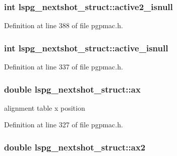 \hypertarget{structlspg__nextshot__struct_a1aa11ff4a4c8d69695786b4349e84e6b}{
\subsubsection[{active2\-\_\-isnull}]{\setlength{\rightskip}{0pt plus 5cm}int lspg\-\_\-nextshot\-\_\-struct\-::active2\-\_\-isnull}}\label{structlspg__nextshot__struct_a1aa11ff4a4c8d69695786b4349e84e6b}


Definition at line 388 of file pgpmac.\-h.

\hypertarget{structlspg__nextshot__struct_a9f777671ec617a0f533b3c51f28babb3}{
\subsubsection[{active\-\_\-isnull}]{\setlength{\rightskip}{0pt plus 5cm}int lspg\-\_\-nextshot\-\_\-struct\-::active\-\_\-isnull}}\label{structlspg__nextshot__struct_a9f777671ec617a0f533b3c51f28babb3}


Definition at line 337 of file pgpmac.\-h.

\hypertarget{structlspg__nextshot__struct_a7f57874223897ab7d9c7531a9522904d}{
\subsubsection[{ax}]{\setlength{\rightskip}{0pt plus 5cm}double lspg\-\_\-nextshot\-\_\-struct\-::ax}}\label{structlspg__nextshot__struct_a7f57874223897ab7d9c7531a9522904d}


alignment table x position 



Definition at line 327 of file pgpmac.\-h.

\hypertarget{structlspg__nextshot__struct_ab76bd38d2a098bc7eda82aff5dcb9c66}{
\subsubsection[{ax2}]{\setlength{\rightskip}{0pt plus 5cm}double lspg\-\_\-nextshot\-\_\-struct\-::ax2}}\label{structlspg__nextshot__struct_ab76bd38d2a098bc7eda82aff5dcb9c66}


